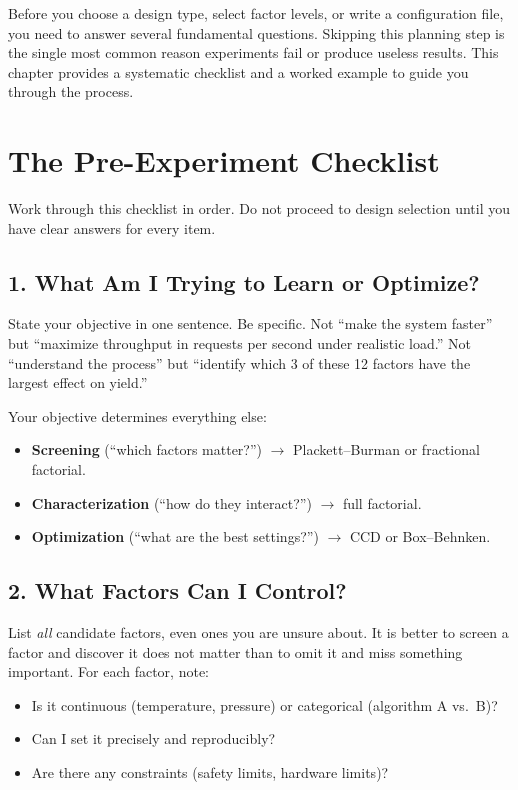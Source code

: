\documentclass[11pt]{book}
\begin{document}
Before you choose a design type, select factor levels, or write a configuration
file, you need to answer several fundamental questions. Skipping this planning
step is the single most common reason experiments fail or produce useless
results. This chapter provides a systematic checklist and a worked example to
guide you through the process.

\section{The Pre-Experiment Checklist}

\begin{keypoint}
Work through this checklist in order. Do not proceed to design selection until
you have clear answers for every item.
\end{keypoint}

\subsection{1. What Am I Trying to Learn or Optimize?}

State your objective in one sentence. Be specific. Not ``make the system
faster'' but ``maximize throughput in requests per second under realistic load.''
Not ``understand the process'' but ``identify which 3 of these 12 factors have
the largest effect on yield.''

Your objective determines everything else:
\begin{itemize}[nosep]
\item \textbf{Screening} (``which factors matter?'') $\to$ Plackett--Burman or
      fractional factorial.
\item \textbf{Characterization} (``how do they interact?'') $\to$ full factorial.
\item \textbf{Optimization} (``what are the best settings?'') $\to$ CCD or
      Box--Behnken.
\end{itemize}

\subsection{2. What Factors Can I Control?}

List \emph{all} candidate factors, even ones you are unsure about. It is better
to screen a factor and discover it does not matter than to omit it and miss
something important. For each factor, note:
\begin{itemize}[nosep]
\item Is it continuous (temperature, pressure) or categorical (algorithm A vs.\ B)?
\item Can I set it precisely and reproducibly?
\item Are there any constraints (safety limits, hardware limits)?
\end{itemize}
\end{document}
